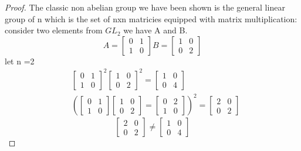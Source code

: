 \documentclass[11pt]{amsart}
\theoremstyle{definition}  %
\begin{document}
\begin{proof}
  The classic non abelian group we have been shown is the general linear group of n which is the set of nxn matricies equipped with matrix multiplication:
  consider two elements from $GL_2$ we have A and B.
  \[
    A=\begin{bmatrix}
      0&1\\
      1&0
  \end{bmatrix}
  B=\begin{bmatrix}
    1&0\\0&2
  \end{bmatrix}
  \]
  let n =2
  \begin{align*}
      &\begin{bmatrix}
        0&1\\
        1&0
    \end{bmatrix}^2
    \begin{bmatrix}
      1&0\\0&2
    \end{bmatrix}^2=
    \begin{bmatrix}
      1&0\\0&4
    \end{bmatrix}\\
    &\left(\begin{bmatrix}
      0&1\\
      1&0
    \end{bmatrix}
    \begin{bmatrix}
      1&0\\0&2
    \end{bmatrix}=
    \begin{bmatrix}
      0&2\\1&0
    \end{bmatrix}\right)^2=
    \begin{bmatrix}
      2&0\\0&2
    \end{bmatrix}
  \end{align*}
  \[
  \begin{bmatrix}
    2&0\\0&2
  \end{bmatrix}\neq\begin{bmatrix}
    1&0\\0&4
  \end{bmatrix}
  \]
\end{proof}
\noindent\makebox[\linewidth]{\rule{\paperwidth}{0.4pt}}
\\\\
\end{document}

